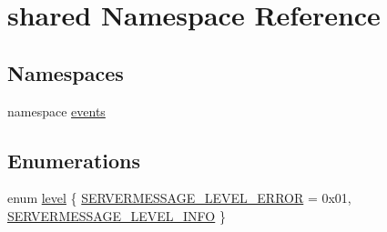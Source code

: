 \hypertarget{namespaceshared}{\section{shared Namespace Reference}
\label{de/d48/namespaceshared}
}
\subsection*{Namespaces}
\begin{DoxyCompactItemize}
\item 
namespace \hyperlink{namespaceshared_1_1events}{events}
\end{DoxyCompactItemize}
\subsection*{Enumerations}
\begin{DoxyCompactItemize}
\item 
enum \hyperlink{namespaceshared_ac45ebac56812e48d57e16c9cf057a1db}{level} \{ \hyperlink{namespaceshared_ac45ebac56812e48d57e16c9cf057a1dba44c7e1aed7f01960e4ad399108ac0050}{S\-E\-R\-V\-E\-R\-M\-E\-S\-S\-A\-G\-E\-\_\-\-L\-E\-V\-E\-L\-\_\-\-E\-R\-R\-O\-R} = 0x01, 
\hyperlink{namespaceshared_ac45ebac56812e48d57e16c9cf057a1dbabbd7360132ef139c387c39bf6c949144}{S\-E\-R\-V\-E\-R\-M\-E\-S\-S\-A\-G\-E\-\_\-\-L\-E\-V\-E\-L\-\_\-\-I\-N\-F\-O}
 \}
\end{DoxyCompactItemize}


